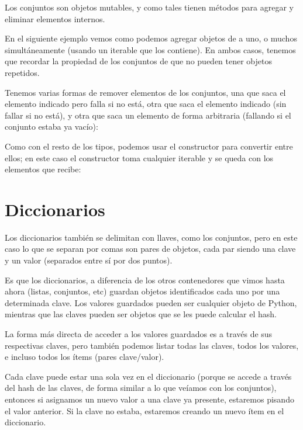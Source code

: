 Los conjuntos son objetos mutables, y como tales tienen métodos para agregar y eliminar elementos internos. 

En el siguiente ejemplo vemos como podemos agregar objetos de a uno, o muchos simultáneamente (usando un iterable que los contiene). En ambos casos, tenemos que recordar la propiedad de los conjuntos de que no pueden tener objetos repetidos.


Tenemos varias formas de remover elementos de los conjuntos, una que saca el elemento indicado pero falla si no está, otra que saca el elemento indicado (sin fallar si no está), y otra que saca un elemento de forma arbitraria (fallando si el conjunto estaba ya vacío):


Como con el resto de los tipos, podemos usar el constructor para convertir entre ellos; en este caso el constructor toma cualquier iterable y se queda con los elementos que recibe:



\section{Diccionarios}

Los diccionarios también se delimitan con llaves, como los conjuntos, pero en este caso lo que se separan por comas son pares de objetos, cada par siendo una clave y un valor (separados entre sí por dos puntos).

Es que los diccionarios, a diferencia de los otros contenedores que vimos hasta ahora (listas, conjuntos, etc) guardan objetos identificados cada uno por una determinada clave. Los valores guardados pueden ser cualquier objeto de Python, mientras que las claves pueden ser objetos que se les puede calcular el hash.

La forma más directa de acceder a los valores guardados es a través de sus respectivas claves, pero también podemos listar todas las claves, todos los valores, e incluso todos los ítems (pares clave/valor).


Cada clave puede estar una sola vez en el diccionario (porque se accede a través del hash de las claves, de forma similar a lo que veíamos con los conjuntos), entonces si asignamos un nuevo valor a una clave ya presente, estaremos pisando el valor anterior. Si la clave no estaba, estaremos creando un nuevo ítem en el diccionario.

